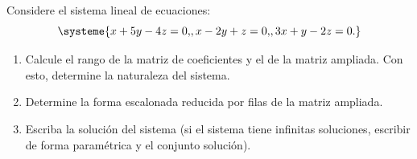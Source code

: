 \documentclass[12pt,a4]{aleph-examen}
\begin{document}
\begin{preguntas}

\item 
    Considere el sistema lineal de ecuaciones:
    \[
        \systeme{x+5y-4z=0{,}, x-2y+z=0{,}, 3x+y-2z=0{.}}
    \]
    \begin{enumerate}
        \item Calcule el rango de la matriz de coeficientes y el de la matriz ampliada. Con esto, determine la naturaleza del sistema.
        \item Determine la forma escalonada reducida por filas de la matriz ampliada.
        \item Escriba la solución del sistema (si el sistema tiene infinitas soluciones, escribir de forma paramétrica y el conjunto solución).
    \end{enumerate}


\end{preguntas}
\end{document}
